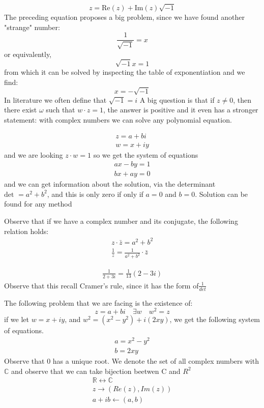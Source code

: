 \[ z = \textrm{Re}(z) + \textrm{Im}(z)\sqrt{-1} \]
The preceding equation proposes a big problem, since we have found another "strange" number:
\[ \frac{1}{\sqrt{-1}} = x \]
 or equivalently,
 \[ \sqrt{-1}x= 1 \]
 from which it can be solved by inspecting the table of exponentiation and we find:
 \[ x = - \sqrt{-1} \]
 In literature we often define that $ \sqrt{-1} = i$
 A big question is that if $ z \neq 0 $, then there exist $ \omega$ such that $ w \cdot z = 1 $, the answer is positive and it even has a stronger statement: with complex numbers we can solve any polynomial equation.
 \begin{mdframed}
 	\begin{align*}
 	z = a + bi \\
 	w = x + iy
 	\end{align*}
 	and we are looking $ z \cdot w = 1$
 	so we get the system of equations
 	\begin{align*}
 	ax - by =1 \\
 	bx + ay = 0
 	\end{align*}
 	and we can get information about the solution, via the determinant $ \textrm{det } = a^2 + b ^2 $, and this is only zero if only if $ a = 0 $ and $ b=0$. Solution can be found for any method
 \end{mdframed}
 Observe that if we have a complex number and its conjugate, the following relation holds:
 \begin{align*}
 z \cdot \bar{z} = a^2 + b^2 \\
 \frac{1}{z} = \frac{1}{a^2 + b^2} \cdot \bar{z}
 \end{align*}
 \begin{mdframed}
 	\begin{align*}
 	\frac{1}{2+3i}= \frac{1}{13}(2-3i)
 	\end{align*}
 	Observe that this recall Cramer's rule, since it has the form of$ \frac{1}{det} $
 \end{mdframed}
 The following problem that we are facing is the existence of:
 \[ z = a+bi \quad \exists w \quad w^2 = z \]
 if we let $ w = x + iy$, and $ w^2 = (x^2-y^2) + i (2xy)$, we get the following system of equations.
 \begin{align*}
 a = x^2 - y^2 \\
 b = 2xy
 \end{align*}
 Observe that $0$ has a unique root.
 We denote the set of all complex numbers with $ \mathbb{C}$ and observe that we can take bijection beetwen C and $R^2$
 \begin{align*}
 \mathbb{R} \leftrightarrow \mathbb{C} \\
 z \longrightarrow ( Re(z),Im(z)) \\
 a + ib \longleftarrow (a,b)
 \end{align*}

